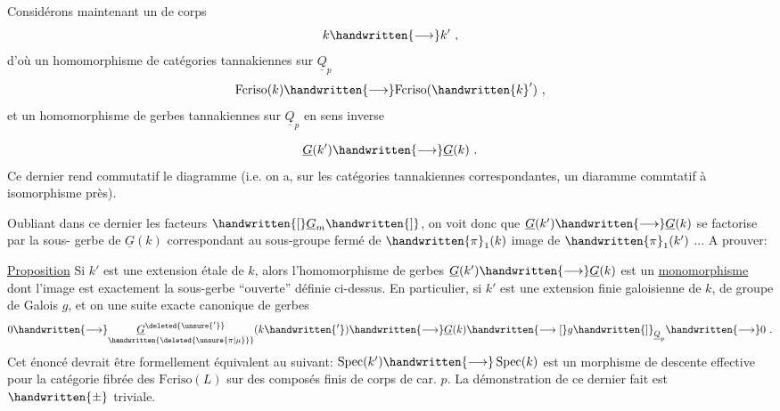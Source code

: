  Considérons maintenant un  de corps
\[
k\handwritten{\longrightarrow}k'\ ,
\]
d'où un homomorphisme de catégories tannakiennes sur $\underline{Q}_p$
\[
\mathrm{Fcriso}(k)\handwritten{\longrightarrow}\mathrm{Fcriso}(\handwritten{k}')\ ,
\]
et un homomorphisme de gerbes tannakiennes sur $\underline{Q}_p$ en sens inverse


\[
\underline{G}(k')\handwritten{\longrightarrow}\underline{G}(k)\ .
\]
Ce dernier rend commutatif  le diagramme
(i.e. on a, sur les catégories tannakiennes correspondantes, un diaramme commtatif à isomorphisme  près).

Oubliant dans ce dernier les facteurs $\handwritten{[}\underline{G}_m\handwritten{]}$, on voit donc que $\underline{G}(k')\handwritten{\longrightarrow}\underline{G}(k)$ se factorise par la sous- gerbe de $\underline{G}(k)$ correspondant au sous-groupe fermé de $\handwritten{\pi}_1(k)$ image de $\handwritten{\pi}_1(k')$ ... A prouver:

\uline{Proposition}  Si $k'$ est une extension  étale de $k$, alors l'homomorphisme de gerbes $\underline{G}(k')\handwritten{\longrightarrow}\underline{G}(k)$ est un \uline{monomorphisme} dont l'image est exactement la sous-gerbe ``ouverte'' définie ci-dessus. En particulier, si $k'$ est une extension finie galoisienne de $k$,  de groupe de Galois $g$, et on une suite exacte canonique de gerbes
\[
0\handwritten{\longrightarrow}\underset{\handwritten{\deleted{\unsure{\pi|\mu}}}}{\underline{G}^{\deleted{\unsure{'}}}}(k\handwritten{'})\handwritten{\longrightarrow}\underline{G}(k)\handwritten{\longrightarrow [}g\handwritten{]}_{\underline{Q}_p}\handwritten{\longrightarrow}0\ .
\]
Cet énoncé devrait être formellement équivalent au suivant: $\operatorname{Spec}(k')\handwritten{\longrightarrow}\operatorname{Spec}(k)$ est un morphisme de descente effective pour la catégorie fibrée des $\mathrm{Fcriso}(L)$ sur des composés finis de corps de car. $p$. La démonstration de ce dernier fait est $\handwritten{\pm}$ triviale.

